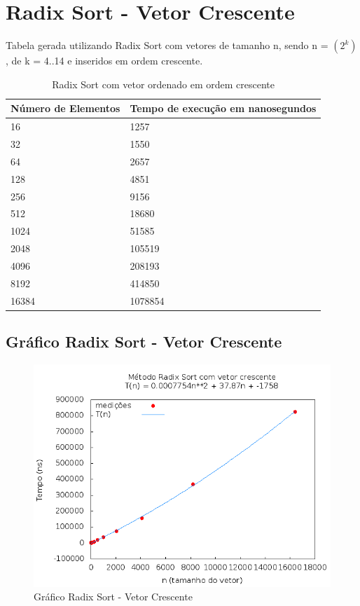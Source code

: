 \documentclass[12pt,a4paper,twoside]{report}
\begin{document}
\section{Radix Sort - Vetor Crescente}
Tabela gerada utilizando Radix Sort com vetores de tamanho n, sendo n = $(2^k)$, de k = 4..14 e inseridos em ordem crescente.
\begin{table}[H]
\centering
\caption{Radix Sort com vetor ordenado em ordem crescente}
\label{my-label}
\begin{tabular}{|l|l|}
\hline
\multicolumn{1}{|c|}{\textbf{Número de Elementos}} & \multicolumn{1}{c|}{\textbf{Tempo de execução em nanosegundos}} \\ \hline
16 & 1257 \\ \hline
32 & 1550 \\ \hline
64 & 2657 \\ \hline
128 & 4851 \\ \hline
256 & 9156 \\ \hline
512 & 18680 \\ \hline
1024 & 51585 \\ \hline
2048 & 105519 \\ \hline
4096 & 208193 \\ \hline
8192 & 414850 \\ \hline
16384 & 1078854 \\ \hline
\end{tabular}
\end{table}

\subsection{Gráfico Radix Sort - Vetor Crescente}
\begin{figure}[H]
    \centering
    \includegraphics[width=0.7\linewidth]{graficos/RadixSort/vIntCrescente/vIntCrescente.png}
  \caption{Gráfico Radix Sort - Vetor Crescente}
\end{figure}
\end{document}
